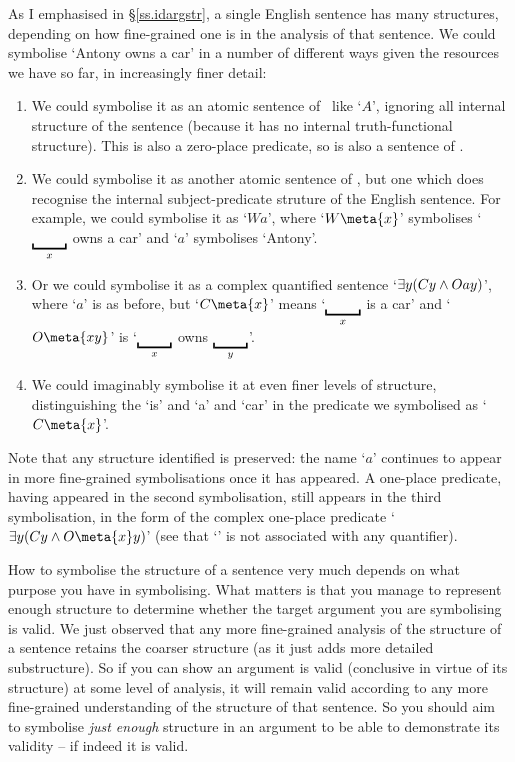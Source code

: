 As I emphasised in §\ref{ss.idargstr}, a single English sentence has many structures, depending on how fine-grained one is in the analysis of that sentence. We could symbolise `Antony owns a car' in a number of different ways given the resources we have so far, in increasingly finer detail: \begin{enumerate}
	\item We could symbolise it as an atomic sentence of \TFL\ like `$A$', ignoring all internal structure of the sentence (because it has no internal truth-functional structure). This is also a zero-place predicate, so is also a sentence of \FOL. 
	\item We could symbolise it as another atomic sentence of \FOL, but one which does recognise the internal subject-predicate struture of the English sentence. For example, we could symbolise it as `$Wa$', where `$W\meta{x}$' symbolises `$\gap{x}$ owns a car' and `$a$' symbolises `Antony'.
	\item Or we could symbolise it as a complex quantified sentence `$\exists y (Cy \wedge Oay)$', where `$a$' is as before, but `$C\meta{x}$' means `$\gap{x}$ is a car' and `$O\meta{xy}$' is `$\gap{x}$ owns $\gap{y}$'.
	\item We could imaginably symbolise it at even finer levels of structure, distinguishing the `is' and `a' and `car' in the predicate we symbolised as `$C\meta{x}$'.
\end{enumerate} Note that any structure identified is preserved: the name `$a$' continues to appear in more fine-grained symbolisations once it has appeared. A one-place predicate, having appeared in the second symbolisation, still appears in the third symbolisation, in the form of the complex one-place predicate `$\exists y (Cy \eand O\meta{x}y)$' (see that `' is not associated with any quantifier).

How to symbolise the structure of a sentence very much depends on what purpose you have in symbolising. What matters is that you manage to represent enough structure to determine whether the target argument you are symbolising is valid. We just observed that any more fine-grained analysis of the structure of a sentence retains the coarser structure (as it just adds more detailed substructure). So if you can show an argument is valid (conclusive in virtue of its structure) at some level of analysis, it will remain valid according to any more fine-grained understanding of the structure of that sentence. So you should aim to symbolise \emph{just enough} structure in an argument to be able to demonstrate its validity – if indeed it is valid.

